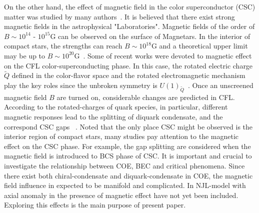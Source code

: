 \documentclass[prd, showpacs,nofootinbib,amsmath,amssymb,12pt]{revtex4}
\begin{document}
On the other hand, the effect of magnetic field in the color superconductor (CSC) matter was studied by many authors~\cite{ferrer2006color,ferrer2007magnetic,ferrer2005magnetic,fukushima2008color,fayazbakhsh2010color,fayazbakhsh2011phase,mandal2013neutrality,mandal2016effect,mandal2017effect}.
It is believed that there exist strong magnetic fields in the astrophysical "Laboratories".
Magnetic fields of the order of $B \sim 10^{14}$ - $10^{15}\text{G}$ can be observed on the surface of Magnetars.
In the interior of compact stars, the strengths can reach $B \sim 10^{18}\text{G}$ and a theoretical upper limit may be up to $B \sim 10^{20}\text{G}$~\cite{dong2001,lai1991cold}.
Some of recent works were devoted to magnetic effect on the CFL color-superconducting phase.
In this case, the rotated electric charge $\widetilde{Q}$ defined in the color-flavor space
and the rotated electromagnetic mechanism play the key roles since the unbroken symmetry is $U(1)_{\widetilde{Q}}$~\cite{alford1998qcd,alford2000mg}.
Once an unscreened magnetic field $B$ are turned on, considerable changes are predicted in CFL.
According to the rotated-charges of quark species, in particular, different magnetic responses lead to the splitting of diquark condensate,
and the correspond CSC gaps ~\cite{ferrer2005magnetic,fukushima2008color,ferrer2006color,ferrer2007magnetic}.
Noted that the only place CSC might be observed is the interior region of compact stars, many studies pay attention to the magnetic effect on the CSC  phase.
For example, the gap splitting are considered when the magnetic field is introduced to BCS phase of CSC.
It is important and crucial to investigate the relationship between COE, BEC and critical phenomena.
Since there exist both chiral-condensate and diquark-condensate in COE, the magnetic field influence in expected to be manifold and complicated.
In NJL-model with axial anomaly in the presence of magnetic effect have not yet been included.
Exploring this effects is the main purpose of present paper.
\end{document}
